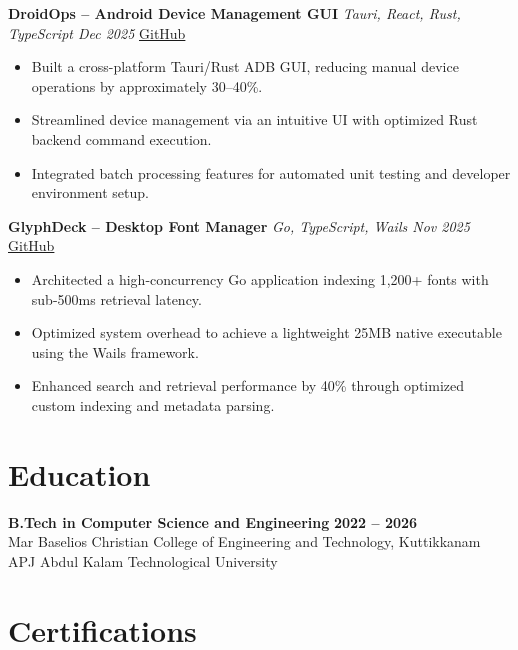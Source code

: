 \documentclass[a4paper,10pt]{article}
\begin{document}
\vspace{2pt}

\textbf{DroidOps -- Android Device Management GUI} \hfill \textit{Tauri, React, Rust, TypeScript \quad Dec 2025} \quad \href{https://github.com/your-github/droidops}{GitHub}
\begin{itemize}
\item Built a cross-platform Tauri/Rust ADB GUI, reducing manual device operations by approximately 30--40\%.
\item Streamlined device management via an intuitive UI with optimized Rust backend command execution.
\item Integrated batch processing features for automated unit testing and developer environment setup.
\end{itemize}

\vspace{2pt}

\textbf{GlyphDeck -- Desktop Font Manager} \hfill \textit{Go, TypeScript, Wails \quad Nov 2025} \quad \href{https://github.com/your-github/GlyphDeck}{GitHub}
\begin{itemize}
\item Architected a high-concurrency Go application indexing 1,200+ fonts with sub-500ms retrieval latency.
\item Optimized system overhead to achieve a lightweight 25MB native executable using the Wails framework.
\item Enhanced search and retrieval performance by 40\% through optimized custom indexing and metadata parsing.
\end{itemize}

\section*{Education}

\textbf{B.Tech in Computer Science and Engineering} \hfill \textbf{2022 -- 2026}\\
Mar Baselios Christian College of Engineering and Technology, Kuttikkanam \hfill APJ Abdul Kalam Technological University

\section*{Certifications}
\end{document}
